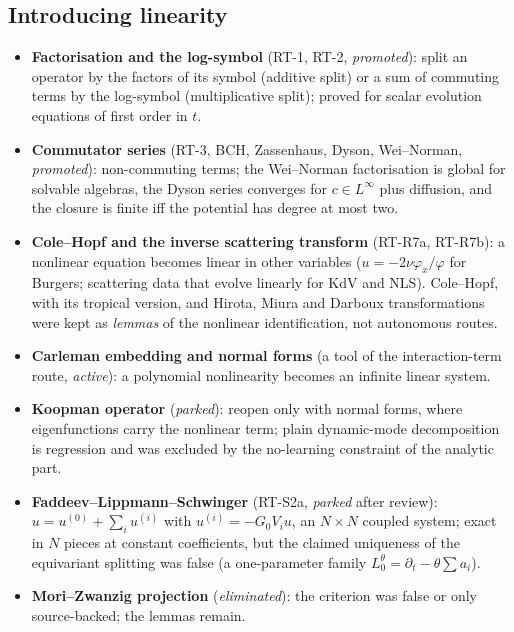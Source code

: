\documentclass[11pt]{article}
\theoremstyle{plain}
\theoremstyle{definition}
\theoremstyle{remark}
\begin{document}
\subsection{Introducing linearity}
\begin{itemize}
\item \textbf{Factorisation and the log-symbol} (RT-1, RT-2, \emph{promoted}): split an operator by the factors of its symbol (additive split) or a sum of commuting terms by the log-symbol (multiplicative split); proved for scalar evolution equations of first order in $t$.
\item \textbf{Commutator series} (RT-3, BCH, Zassenhaus, Dyson, Wei--Norman, \emph{promoted}): non-commuting terms; the Wei--Norman factorisation is global for solvable algebras, the Dyson series converges for $c\in L^\infty$ plus diffusion, and the closure is finite iff the potential has degree at most two.
\item \textbf{Cole--Hopf and the inverse scattering transform} (RT-R7a, RT-R7b): a nonlinear equation becomes linear in other variables ($u=-2\nu\varphi_x/\varphi$ for Burgers; scattering data that evolve linearly for KdV and NLS). Cole--Hopf, with its tropical version, and Hirota, Miura and Darboux transformations were kept as \emph{lemmas} of the nonlinear identification, not autonomous routes.
\item \textbf{Carleman embedding and normal forms} (a tool of the interaction-term route, \emph{active}): a polynomial nonlinearity becomes an infinite linear system.
\item \textbf{Koopman operator} (\emph{parked}): reopen only with normal forms, where eigenfunctions carry the nonlinear term; plain dynamic-mode decomposition is regression and was excluded by the no-learning constraint of the analytic part.
\item \textbf{Faddeev--Lippmann--Schwinger} (RT-S2a, \emph{parked} after review): $u=u^{(0)}+\sum_iu^{(i)}$ with $u^{(i)}=-G_0V_iu$, an $N\times N$ coupled system; exact in $N$ pieces at constant coefficients, but the claimed uniqueness of the equivariant splitting was false (a one-parameter family $L_0^\theta=\partial_t-\theta\sum a_i$).
\item \textbf{Mori--Zwanzig projection} (\emph{eliminated}): the criterion was false or only source-backed; the lemmas remain.
\end{itemize}
\end{document}
